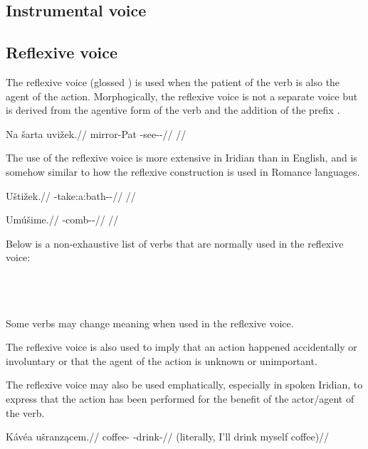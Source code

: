 \subsection{Instrumental voice}


\subsection{Reflexive voice}

The reflexive voice (glossed {\Refl}) is used when the patient of the verb is also the agent of the action. Morphogically, the reflexive voice is not a separate voice but is derived from the agentive form of the verb and the addition of the prefix .

\pex
\begingl
\gla Na šarta uvižek.//
\glb \Loc{} mirror-Pat{} \Refl{}-see-\Av{}-\Pf{}//
\glft {}//
\endgl
\xe

The use of the reflexive voice is more extensive in Iridian than in English, and is somehow similar to how the reflexive construction is used in Romance languages.

\pex
\begingl
\gla Uštižek.//
\glb \Refl{}-take:a:bath-\Av{}-\Pf{}//
\glft {}//
\endgl
\xe

\pex
\begingl
\gla Umúšime.//
\glb \Refl{}-comb-\Av{}-\Prog{}//
\glft {}//
\endgl
\xe

Below is a non-exhaustive list of verbs that are normally used in the reflexive voice:
\bigskip

\noindent
{} \\
 \\
 \\

Some verbs may change meaning when used in the reflexive voice.


The reflexive voice is also used to imply that an action happened accidentally or involuntary or that the agent of the action is unknown or unimportant.

The reflexive voice may also be used emphatically, especially in spoken Iridian, to express that the action has been performed for the benefit of the actor/agent of the verb.

\pex
\begingl
\gla Kávéa ušranz\k{a}cem.//
\glb coffee-\Acc{} \Refl{}-drink-//
\glft {} (literally, I'll drink myself coffee)//
\endgl
\xe

